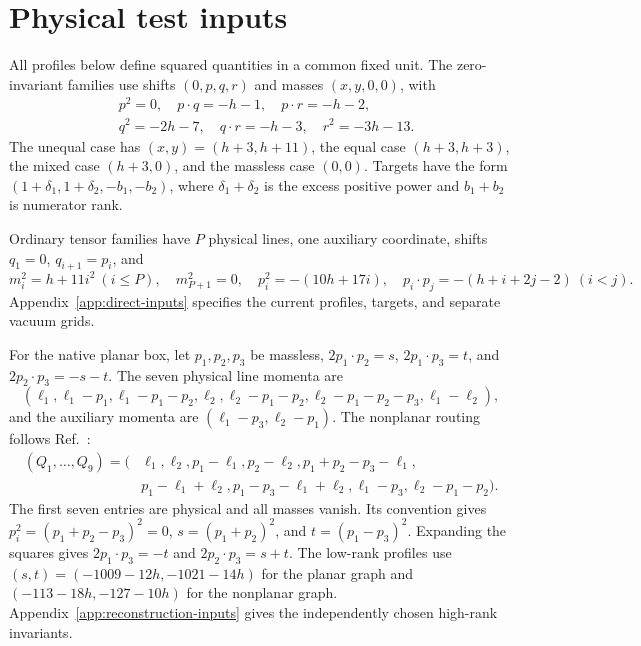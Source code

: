 \section{Physical test inputs}
\label{app:families-new}
All profiles below define squared quantities in a common fixed unit. The zero-invariant families use shifts $(0,p,q,r)$ and masses $(x,y,0,0)$, with
\begin{align}
 &p^2=0,\quad p\cdot q=-h-1,\quad p\cdot r=-h-2,\nonumber\\
 &q^2=-2h-7,\quad q\cdot r=-h-3,\quad r^2=-3h-13.
 \label{eq:light-input}
\end{align}
The unequal case has $(x,y)=(h+3,h+11)$, the equal case $(h+3,h+3)$, the mixed case $(h+3,0)$, and the massless case $(0,0)$. Targets have the form $(1+\delta_1,1+\delta_2,-b_1,-b_2)$, where $\delta_1+\delta_2$ is the excess positive power and $b_1+b_2$ is numerator rank.

Ordinary tensor families have $P$ physical lines, one auxiliary coordinate, shifts $q_1=0$, $q_{i+1}=p_i$, and
\begin{equation}
 m_i^2=h+11i^2\ (i\leq P),\quad m_{P+1}^2=0,\quad
 p_i^2=-(10h+17i),\quad p_i\cdot p_j=-(h+i+2j-2)\ (i<j).
 \label{eq:ordinary-input}
\end{equation}
Appendix~\ref{app:direct-inputs} specifies the current profiles, targets, and separate vacuum grids.

For the native planar box, let $p_1,p_2,p_3$ be massless, $2p_1\cdot p_2=s$, $2p_1\cdot p_3=t$, and $2p_2\cdot p_3=-s-t$. The seven physical line momenta are
\begin{equation}
 (\ell_1,\ell_1-p_1,\ell_1-p_1-p_2,\ell_2,
 \ell_2-p_1-p_2,\ell_2-p_1-p_2-p_3,\ell_1-\ell_2),
 \label{eq:planar-input}
\end{equation}
and the auxiliary momenta are $(\ell_1-p_3,\ell_2-p_1)$. The nonplanar routing follows Ref.~\cite{KiraOriginal}:
\begin{align}
 (Q_1,\ldots,Q_9)=(&\ell_1,\ell_2,p_1-\ell_1,p_2-\ell_2,
 p_1+p_2-p_3-\ell_1,\nonumber\\
 &p_1-\ell_1+\ell_2,p_1-p_3-\ell_1+\ell_2,
 \ell_1-p_3,\ell_2-p_1-p_2).
 \label{eq:nonplanar-input}
\end{align}
The first seven entries are physical and all masses vanish. Its convention gives $p_i^2=(p_1+p_2-p_3)^2=0$, $s=(p_1+p_2)^2$, and $t=(p_1-p_3)^2$. Expanding the squares gives $2p_1\cdot p_3=-t$ and $2p_2\cdot p_3=s+t$. The low-rank profiles use $(s,t)=(-1009-12h,-1021-14h)$ for the planar graph and $(-113-18h,-127-10h)$ for the nonplanar graph. Appendix~\ref{app:reconstruction-inputs} gives the independently chosen high-rank invariants.

